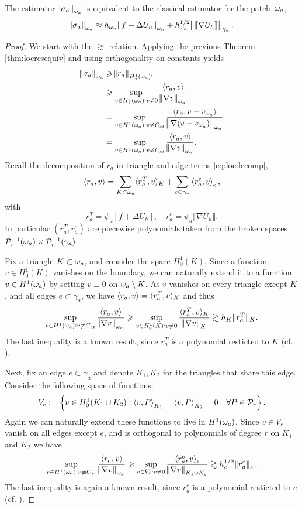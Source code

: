 \documentclass[thesis.tex]{subfiles}
\begin{document}
\begin{lem}
  \label{lem:starequiv}
  The estimator $\norm{\sigma_a}_{\omega_a}$ is equivalent to the classical estimator for the patch~$\omega_a$, 
  \[
    \norm{\sigma_a}_{\omega_a} \approx h_{\omega_a}\norm{f + \Delta U_h}_{\omega_a} + h^{1/2}_{\omega_a} \norm{\llbracket \nabla U_h  \rrbracket}_{\gamma_a}.
  \]
\end{lem}
\begin{proof}
  We start with the $\gtrsim$ relation.  Applying the previous Theorem \ref{thm:locresequiv} and using orthogonality on constants yields  
  \begin{align*}
    \norm{\sigma_a}_{\omega_a} &\geqslant \norm{r_a}_{H^1_\star(\omega_a)'} \\
    &\geqslant \sup_{v \in H^1_\star(\omega_a) : v \ne 0} { \left \langle r_a, v \right \rangle \over \norm{\nabla v}_{\omega_a}} \\
    &= \sup_{v \in H^1(\omega_a) : v \not \equiv C_{st}} { \left \langle r_a, v - v_{\omega_a} \right \rangle \over \norm{\nabla (v - v_{\omega_a})}_{\omega_a}} \\
          &= \sup_{v \in H^1(\omega_a) : v \not \equiv C_{st}} { \left \langle r_a, v \right \rangle \over \norm{\nabla v}_{\omega_a}}.
  \end{align*}
  Recall the decomposition of $r_a$ in triangle and edge terms \eqref{eq:locdecomp},
  \[
    \left \langle r_a,v \right \rangle = \sum_{K\subset \omega_a} \langle{r^T_a, v}\rangle_K + \sum_{e \subset \gamma_a} \left \langle r^e_a, v \right \rangle_e,
  \]
  with 
  \[
   r^T_a = \psi_a \left[ f + \Delta U_h \right], \quad r^e_a = \psi_a \llbracket \nabla U_h \rrbracket.
  \]
  In particular $(r^T_a, r^e_a)$ are piecewise polynomials taken from the broken spaces $\mathcal{P}_r^{-1}(\omega_a)\times \mathcal{P}_r^{-1}(\gamma_a)$.

  Fix a triangle $K \subset \omega_a$, and consider the space $H_0^1(K)$. Since a function $v \in H_0^1(K)$ vanishes on the boundary, 
  we can naturally extend it to a function $v \in H^1(\omega_a)$ by setting $v \equiv 0$ on $\omega_a \setminus K$. As $v$
  vanishes on every triangle except $K$, and all edges $e \subset \gamma_a$, we have $\left \langle r_a, v \right \rangle = \langle{r_a^T, v}\rangle_K$ and thus
  \[
         \sup_{v \in H^1(\omega_a) : v \not \equiv C_{st}} { \left \langle r_a, v \right \rangle \over \norm{\nabla v}_{\omega_a}} 
         \geqslant \sup_{v \in H_0^1(K) : v \ne 0} { \langle{r^T_a, v}\rangle_K \over \norm{\nabla v}_{K}}
         \gtrsim h_K \|{r^T_a}\|_K.
  \]
  The last inequality is a known result, since $r^T_a$ is a polynomial resticted to $K$ (cf. \cite[Ex~9.x.5]{brenner}).
  
  Next, fix an edge $e \subset \gamma_a$ and denote $K_1, K_2$ for the triangles that share this edge. Consider the following space of functions:
  \[
  V_e := \set{v \in H_0^1(K_1 \cup K_2) : \left \langle v,P \right \rangle_{K_1}= \left \langle v,P \right \rangle_{K_2} = 0\quad \forall P \in \mathcal{P}_r}.\]
  Again we can naturally extend these functions to live in $H^1(\omega_a)$. Since $v \in V_e$ vanish on all edges except $e$, and
  is orthogonal to polynomials of degree $r$ on $K_1$ and $K_2$ we have
  \[
         \sup_{v \in H^1(\omega_a) : v \not \equiv C_{st}} { \left \langle r_a, v \right \rangle \over \norm{\nabla v}_{\omega_a}} 
         \geqslant \sup_{v \in V_e: v \ne 0} { \langle r^e_a, v \rangle_e \over \norm{\nabla v}_{K_1 \cup K_2}}
         \gtrsim h_e^{1/2} \norm{r^e_a}_e.
  \]
  The last inequality is again a known result, since $r^e_a$ is a polynomial resticted to $e$ (cf. \cite[Ex~9.x.7]{brenner}).


\end{proof}
\end{document}
